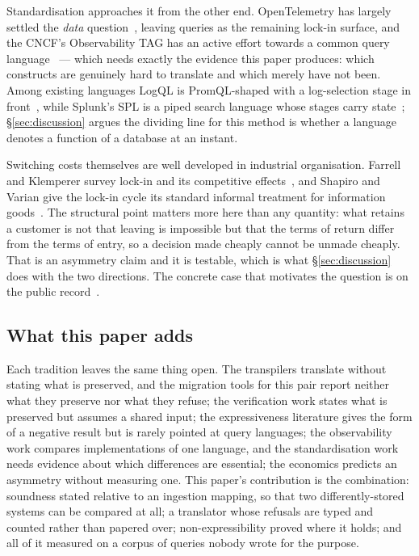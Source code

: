Standardisation approaches it from the other end. OpenTelemetry has largely settled the
\emph{data} question~\citep{otel}, leaving queries as the remaining lock-in surface, and
the CNCF's Observability TAG has an active effort towards a common query
language~\citep{sharma2025} --- which needs exactly the evidence this paper produces:
which constructs are genuinely hard to translate and which merely have not been. Among
existing languages LogQL is PromQL-shaped with a log-selection stage in
front~\citep{logql}, while Splunk's SPL is a piped search language whose stages carry
state~\citep{splunk}; \S\ref{sec:discussion} argues the dividing line for this method is
whether a language denotes a function of a database at an instant.

Switching costs themselves are well developed in industrial organisation. Farrell and
Klemperer survey lock-in and its competitive effects~\citep{farrell2007}, and Shapiro and
Varian give the lock-in cycle its standard informal treatment for information
goods~\citep{shapiro1999}. The structural point matters more here than any quantity: what
retains a customer is not that leaving is impossible but that the terms of return differ
from the terms of entry, so a decision made cheaply cannot be unmade cheaply. That is an
asymmetry claim and it is testable, which is what \S\ref{sec:discussion} does with the
two directions. The concrete case that motivates the question is on the public
record~\citep{orosz2023}.

\subsection{What this paper adds}

Each tradition leaves the same thing open. The transpilers translate without stating what
is preserved, and the migration tools for this pair report neither what they preserve nor
what they refuse; the verification work states what is preserved but assumes a shared input;
the expressiveness literature gives the form of a negative result but is rarely pointed
at query languages; the observability work compares implementations of one language, and
the standardisation work needs evidence about which differences are essential; the
economics predicts an asymmetry without measuring one. This paper's contribution is the
combination: soundness stated relative to an ingestion mapping, so that two
differently-stored systems can be compared at all; a translator whose refusals are typed
and counted rather than papered over; non-expressibility proved where it holds; and all
of it measured on a corpus of queries nobody wrote for the purpose.
